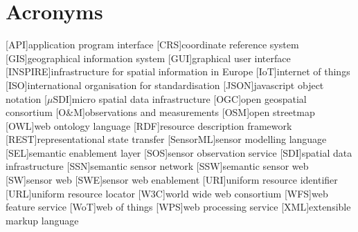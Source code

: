 
\chapter*{Acronyms}

\begin{acronym}[UML]
  [API]{application program interface}
  [CRS]{coordinate reference system} 
  [GIS]{geographical information system}
  [GUI]{graphical user interface}
  [INSPIRE]{infrastructure for spatial information in Europe}
  [IoT]{internet of things}
  [ISO]{international organisation for standardisation}
  [JSON]{javascript object notation}
  [$\mu$SDI]{micro spatial data infrastructure}
  [OGC]{open geospatial consortium}
  [O\&M]{observations and measurements}
  [OSM]{open streetmap}
  [OWL]{web ontology language}
  [RDF]{resource description framework}
  [REST]{representational state transfer}
  [SensorML]{sensor modelling language}
  [SEL]{semantic enablement layer}
  [SOS]{sensor observation service}
  [SDI]{spatial data infrastructure}
  [SSN]{semantic sensor network}
  [SSW]{semantic sensor web}
  [SW]{sensor web}
  [SWE]{sensor web enablement}
  [URI]{uniform resource identifier}
  [URL]{uniform resource locator}
  [W3C]{world wide web consortium}
  [WFS]{web feature service}
  [WoT]{web of things}
  [WPS]{web processing service}
  [XML]{extensible markup language}
\end{acronym}
